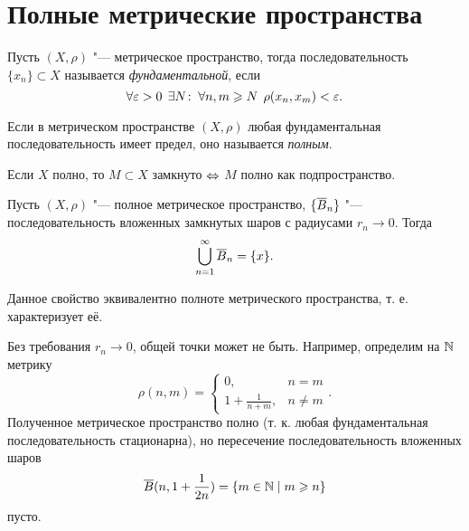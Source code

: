 \documentclass[main]{subfiles}
\begin{document}
\section{Полные метрические пространства}

\begin{definition}
  Пусть \( (X, \rho) \) "--- метрическое пространство,
  тогда последовательность \( \{ x_n \} \subset X \)
  называется \emph{фундаментальной},
  если
  \[
    \forall {\varepsilon> 0} \; \, \exists N \colon \: \forall {n, m \geqslant N} \; \,
    \rho(x_n, x_m) < \varepsilon.
  \]
\end{definition}

\begin{definition}
  Если в метрическом пространстве \( (X, \rho) \)
  любая фундаментальная последовательность имеет предел,
  оно называется \emph{полным}.
\end{definition}

\begin{exercise}
  Если \( X \) полно, то \( M \subset X \)
  замкнуто \( \Leftrightarrow \) \( M \) полно как подпространство.
\end{exercise}

\begin{theorem}
  Пусть \( (X, \rho) \) "--- полное метрическое пространство,
  \( \{ \overline{B}_n \} \) "---
  последовательность вложенных замкнутых шаров с радиусами
  \( r_n \to 0 \). Тогда
  \[
    \bigcup_{n = 1}^\infty \overline{B}_n = \{ x \}.
  \]
\end{theorem}
\begin{remark}
  Данное свойство эквивалентно полноте метрического пространства,
  т. е. характеризует её.
\end{remark}
\begin{remark}
  Без требования \( r_n \to 0 \), общей точки может не быть.
  Например, определим на \( \mathbb{N} \)
  метрику
  \[
    \rho(n, m) = \begin{cases}
      0, & n = m \\
      1 + \frac{1}{n + m}, & n \ne m
    \end{cases}.
  \]
  Полученное метрическое пространство полно
  (т. к. любая фундаментальная последовательность стационарна),
  но пересечение последовательность вложенных шаров
  \[
    \overline{B}(n, 1 + \frac{1}{2n}) = \{ m \in \mathbb{N} \mid m \geqslant n \}
  \]
  пусто.
\end{remark}
\end{document}
